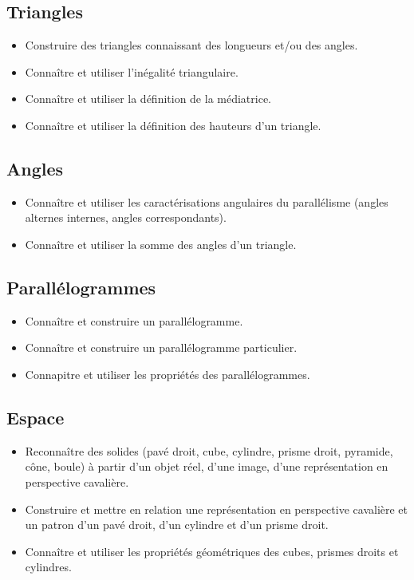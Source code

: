 \documentclass[a4paper,12pt,fleqn]{article}
\begin{document}
\subsection*{Triangles}

\begin{itemize}[itemsep=1em]
	\item {}Construire des triangles connaissant des longueurs et/ou des angles.
	\item {}Connaître et utiliser l'inégalité triangulaire.
	\item {}Connaître et utiliser la définition de la médiatrice.
	\item {}Connaître et utiliser la définition des hauteurs d’un triangle.
\end{itemize}

\subsection*{Angles}

\begin{itemize}[itemsep=1em]
	\item {}Connaître et utiliser les caractérisations angulaires du parallélisme (angles alternes internes, angles correspondants).
	\item {}Connaître et utiliser la somme des angles d’un triangle.
\end{itemize}

\subsection*{Parallélogrammes}

\begin{itemize}[itemsep=1em]
	\item {}Connaître et construire un parallélogramme.
	\item {}Connaître et construire un parallélogramme particulier.
	\item {}Connapitre et utiliser les propriétés des parallélogrammes.
\end{itemize}

\subsection*{Espace}

\begin{itemize}[itemsep=1em]
	\item {}Reconnaître des solides (pavé droit, cube, cylindre, prisme droit, pyramide, cône, boule) à partir d’un objet réel, d’une image, d’une représentation en perspective cavalière.
	\item {}Construire et mettre en relation une représentation en perspective cavalière et un patron d’un pavé droit, d’un cylindre et d'un prisme droit.
    \item{}Connaître et utiliser les propriétés géométriques des cubes, prismes droits et cylindres.
\end{itemize}
\end{document}
